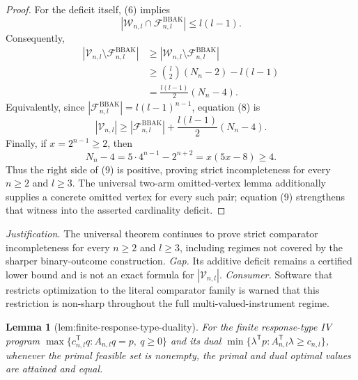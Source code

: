 \documentclass{article}
\newtheorem{lemma}{Lemma}
\begin{document}
\begin{proof}
For the deficit itself, (6) implies
\[|\mathcal W_{n,l}\cap\mathcal F^{\mathrm{BBAK}}_{n,l}|\le l(l-1).\]
Consequently,
\[\begin{aligned}|\mathcal V_{n,l}\setminus\mathcal F^{\mathrm{BBAK}}_{n,l}|&\ge|\mathcal W_{n,l}\setminus\mathcal F^{\mathrm{BBAK}}_{n,l}|\\&\ge\binom l2(N_n-2)-l(l-1)\\&=\frac{l(l-1)}2(N_n-4).\end{aligned}\tag{9}\]
Equivalently, since \(|\mathcal F^{\mathrm{BBAK}}_{n,l}|=l(l-1)^{n-1}\), equation (8) is
\[|\mathcal V_{n,l}|\ge|\mathcal F^{\mathrm{BBAK}}_{n,l}|+\frac{l(l-1)}2(N_n-4).\tag{10}\]
Finally, if \(x=2^{n-1}\ge2\), then
\[N_n-4=5\cdot4^{n-1}-2^{n+2}=x(5x-8)\ge4.\]
Thus the right side of (9) is positive, proving strict incompleteness for every \(n\ge2\) and \(l\ge3\). The universal two-arm omitted-vertex lemma additionally supplies a concrete omitted vertex for every such pair; equation (9) strengthens that witness into the asserted cardinality deficit.
\end{proof}
\par\smallskip\noindent \textit{Justification.} The universal theorem continues to prove strict comparator incompleteness for every \(n\ge2\) and \(l\ge3\), including regimes not covered by the sharper binary-outcome construction. \textit{Gap.} Its additive deficit remains a certified lower bound and is not an exact formula for \(|\mathcal V_{n,l}|\). \textit{Consumer.} Software that restricts optimization to the literal comparator family is warned that this restriction is non-sharp throughout the full multi-valued-instrument regime.

\begin{lemma}[lem:finite-response-type-duality]\label{lem:finite-response-type-duality}
For the finite response-type IV program \(\max\{c_{n,l}^{\mathsf T}q:A_{n,l}q=p,\ q\ge0\}\) and its dual \(\min\{\lambda^{\mathsf T}p:A_{n,l}^{\mathsf T}\lambda\ge c_{n,l}\}\), whenever the primal feasible set is nonempty, the primal and dual optimal values are attained and equal.
\end{lemma}
\end{document}
